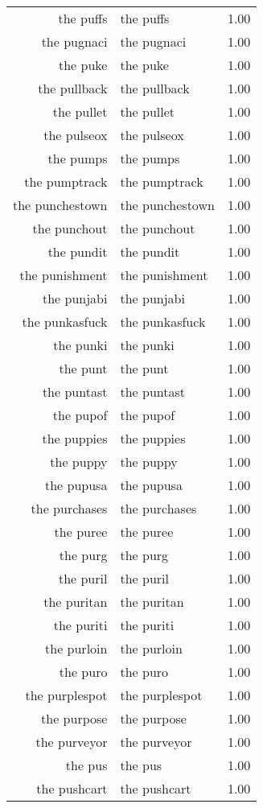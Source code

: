 \begin{table}[ht]
\begin{tabular}{rlr}
  the puffs & the puffs & 1.00 \\ 
  the pugnaci & the pugnaci & 1.00 \\ 
  the puke & the puke & 1.00 \\ 
  the pullback & the pullback & 1.00 \\ 
  the pullet & the pullet & 1.00 \\ 
  the pulseox & the pulseox & 1.00 \\ 
  the pumps & the pumps & 1.00 \\ 
  the pumptrack & the pumptrack & 1.00 \\ 
  the punchestown & the punchestown & 1.00 \\ 
  the punchout & the punchout & 1.00 \\ 
  the pundit & the pundit & 1.00 \\ 
  the punishment & the punishment & 1.00 \\ 
  the punjabi & the punjabi & 1.00 \\ 
  the punkasfuck & the punkasfuck & 1.00 \\ 
  the punki & the punki & 1.00 \\ 
  the punt & the punt & 1.00 \\ 
  the puntast & the puntast & 1.00 \\ 
  the pupof & the pupof & 1.00 \\ 
  the puppies & the puppies & 1.00 \\ 
  the puppy & the puppy & 1.00 \\ 
  the pupusa & the pupusa & 1.00 \\ 
  the purchases & the purchases & 1.00 \\ 
  the puree & the puree & 1.00 \\ 
  the purg & the purg & 1.00 \\ 
  the puril & the puril & 1.00 \\ 
  the puritan & the puritan & 1.00 \\ 
  the puriti & the puriti & 1.00 \\ 
  the purloin & the purloin & 1.00 \\ 
  the puro & the puro & 1.00 \\ 
  the purplespot & the purplespot & 1.00 \\ 
  the purpose & the purpose & 1.00 \\ 
  the purveyor & the purveyor & 1.00 \\ 
  the pus & the pus & 1.00 \\ 
  the pushcart & the pushcart & 1.00 \\ 

\end{tabular}
\end{table}
